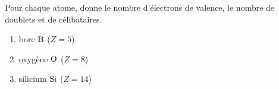 \documentclass[11pt,a4paper]{article}
\begin{document}
\begin{exo}
Pour chaque atome, donne le nombre d'électrons de valence, le nombre de doublets et de célibataires.
\begin{enumerate}[label=\alph*)]
  \item bore $\ce{B}$ ($Z = 5$)
  \item oxygène $\ce{O}$ ($Z = 8$)
  \item silicium $\ce{Si}$ ($Z = 14$)
\end{enumerate}
\end{exo}
\end{document}
